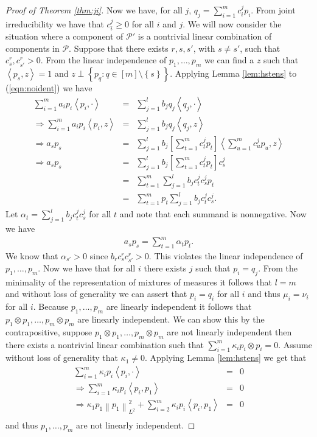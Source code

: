 \documentclass[aos,preprint]{imsart}
\def\l{\left}
\def\r{\right}
\def\sP{\mathscr{P}}
\theoremstyle{plain}
\theoremstyle{defintion}
\begin{document}
\begin{proof}[Proof of Theorem \ref{thm:ji}]
		Now we have, for all $j$, $q_j = \sum_{i=1}^m c_i^j p_i$. From joint irreducibility we have that $c_i^j \ge 0$ for all $i$ and $j$. We will now consider the situation where a component of $\sP'$ is a nontrivial linear combination of components in $\sP$. Suppose that there exists $r,s,s'$, with $s \neq s'$, such that $c_s^r,c_{s'}^r >0$. From the linear independence of $p_1,\ldots,p_m$ we can find a $z$ such that $\l<p_s,z\r> = 1$ and $z\perp \left\{ p_q:q\in \left[ m \right]\setminus \left\{ s \right\} \right\}$. Applying Lemma \ref{lem:hstens} to (\ref{eqn:noident}) we have
		\begin{eqnarray*}
			\sum_{i=1}^m  a_i p_i \l< p_i, \cdot \r> &=& \sum_{j=1}^l  b_j q_j \l<q_j,\cdot\r>\\
			\Rightarrow \sum_{i=1}^m  a_i p_i \l< p_i, z \r> &=& \sum_{j=1}^l  b_j q_j \l<q_j,z\r>\\
			\Rightarrow  a_s p_s  &=& \sum_{j=1}^l  b_j \l[\sum_{t=1}^m c_t^j p_t\r] \l<\sum_{u=1}^m c_u^j p_u,z\r>\\
			\Rightarrow  a_s p_s  &=& \sum_{j=1}^l  b_j \l[\sum_{t=1}^m c_t^j p_t\r] c_s^j\\
                        &=&    \sum_{t=1}^m \sum_{j=1}^l b_jc_t^j c_s^j p_t \\
                        &=&    \sum_{t=1}^m p_t \sum_{j=1}^l b_jc_t^j c_s^j. 
		\end{eqnarray*}
		Let $\alpha_t = \sum_{j=1}^l b_jc_t^j c_s^j$ for all $t$ and note that each summand is nonnegative. Now we have
		\begin{eqnarray*}
			a_s p_s = \sum_{t=1}^m \alpha_t p_t.
		\end{eqnarray*}
		 We know that $\alpha_{s'}>0$ since $b_r c_s^r c_{s'}^r >0$. This violates the linear independence of $p_1,\ldots,p_m$. Now we have that for all $i$ there exists $j$ such that $p_i = q_j$. From the minimality of the representation of mixtures of measures it follows that $l=m$ and without loss of generality we can assert that $p_i = q_i$ for all $i$ and thus $\mu_i = \nu_i$ for all $i$. Because $p_1, \ldots, p_m$ are linearly independent it follows that $p_1\otimes p_1,\ldots, p_m\otimes p_m$ are linearly independent. We can show this by the contrapositive, suppose $p_1\otimes p_1, \ldots , p_m\otimes p_m$ are not linearly independent then there exists a nontrivial linear combination such that  $\sum_{i=1}^m \kappa_i p_i\otimes p_i = 0$. Assume without loss of generality that $\kappa_1 \neq 0$. Applying Lemma \ref{lem:hstens} we get that
		\begin{eqnarray*}
			\sum_{i=1}^m \kappa_i p_i \l<p_i,\cdot\r> &=&  0\\
			\Rightarrow \sum_{i=1}^m \kappa_i p_i \l<p_i,p_1\r> &=&  0\\
			\Rightarrow \kappa_1 p_1 \l\|p_1\r\|_{L^2}^2 + \sum_{i=2}^m \kappa_i p_i \l<p_i,p_1\r> &=&  0\\
		\end{eqnarray*}
		and thus $p_1,\ldots,p_m$ are not linearly independent.


\end{proof}
\end{document}
